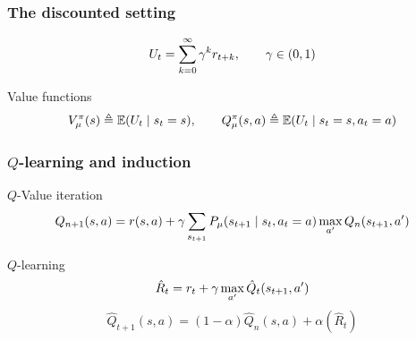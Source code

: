 \documentclass[9pt]{beamer}
\begin{document}
\begin{frame}
  \frametitle{The discounted setting}
  \[
  U_t = \sum_{k=0}^\infty \gamma^k r_{t+k}, \qquad \gamma \in (0, 1)
  \]
  \begin{block}{Value functions}
    \[
    V^\pi_\mu(s) \mathrel{\triangleq} \mathop{\mbox{\ensuremath{\mathbb{E}}}}\nolimits(U_t \mid s_t = s), 
    \qquad
    Q^\pi_\mu(s,a) \mathrel{\triangleq} \mathop{\mbox{\ensuremath{\mathbb{E}}}}\nolimits(U_t \mid s_t = s, a_t = a)
    \]
  \end{block}
  \end{frame}

  \begin{frame}
    \frametitle{$Q$-learning and induction}
    \begin{block}{$Q$-Value iteration}
      \[
      Q_{n+1}(s,a) = r(s,a) + \gamma \sum_{s_{t+1}}  P_\mu(s_{t+1} \mid s_t, a_t = a) \max_{a'} Q_n(s_{t+1}, a')
      \]
    \end{block}

    \begin{block}{$Q$-learning}
      \[
      \hat{R}_t = r_t + \gamma \max_{a'}  \hat{Q}_t(s_{t+1}, a')
      \]
      \[
      \hat{Q}_{t+1}(s,a) = (1 - \alpha) \hat{Q}_n(s,a) + \alpha(\hat{R}_t)
      \]
    \end{block}
    
  \end{frame}
\end{document}
